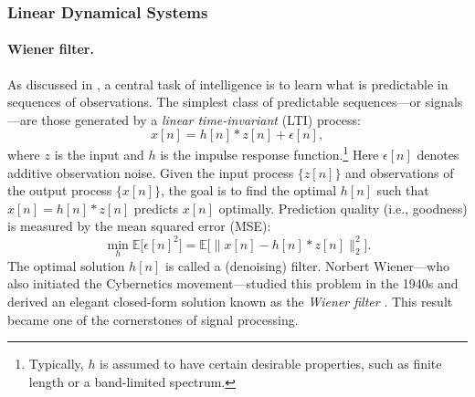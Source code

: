 \documentclass[../../book-main.tex]{subfiles}
\begin{document}
\subsubsection{Linear Dynamical Systems}
\label{sec:linear-systems}

\paragraph{Wiener filter.}

As discussed in , a central task of intelligence is to learn what is predictable in sequences of observations. The simplest class of predictable sequences---or signals---are those generated by a \textit{linear time-invariant} (LTI) process:
\begin{equation}
    x[n] = h[n]*z[n] + \epsilon[n], 
    \label{eqn:Wiener-model}
\end{equation}
where $z$ is the input and $h$ is the impulse response function.\footnote{Typically, $h$ is assumed to have certain desirable properties, such as finite length or a band-limited spectrum.} Here $\epsilon[n]$ denotes additive observation noise. Given the input process $\{z[n]\}$ and observations of the output process $\{x[n]\}$, the goal is to find the optimal $h[n]$ such that $\hat x[n] = h[n]*z[n]$ predicts $x[n]$ optimally. Prediction quality (i.e., goodness) is measured by the mean squared error (MSE):
\begin{equation}
    \min_{h} \mathbb{E} \big[\epsilon[n]^2\big] = \mathbb{E} \big[\|x[n] - h[n]*z[n]\|_2^2\big].
\end{equation}
The optimal solution $h[n]$ is called a (denoising) filter. Norbert Wiener---who also initiated the Cybernetics movement---studied this problem in the 1940s and derived an elegant closed-form solution known as the \textit{Wiener filter} \cite{Wiener-1942,Wiener-1949}. This result became one of the cornerstones of signal processing.
\end{document}

